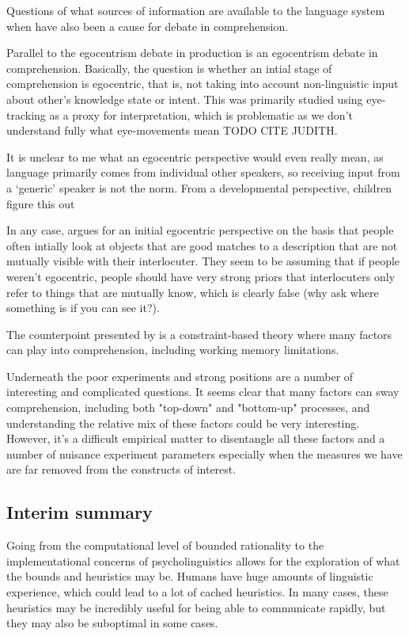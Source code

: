 \documentclass[]{article}
\begin{document}
Questions of what sources of information are available to the language system when have also been a cause for debate in comprehension. 

Parallel to the egocentrism debate in production is an egocentrism debate in comprehension. Basically, the question is whether an intial stage of comprehension is egocentric, that is, not taking into account non-linguistic input about other's knowledge state or intent. This was primarily studied using eye-tracking as a proxy for interpretation, which is problematic as we don't understand fully what eye-movements mean TODO CITE JUDITH. 

It is unclear to me what an egocentric perspective would even really mean, as language primarily comes from individual other speakers, so receiving input from a `generic' speaker is not the norm. From a developmental perspective, children figure this out %

In any case, \cite{keysar2000} argues for an initial egocentric perspective on the basis that people often intially look at objects that are good matches to a description that are not mutually visible with their interlocuter. They seem to be assuming that if people weren't egocentric, people should have very strong priors that interlocuters only refer to things that are mutually know, which is clearly false (why ask where something is if you can see it?). 

The counterpoint presented by \cite{hanna2003} is a constraint-based theory where many factors can play into comprehension, including working memory limitations. 

Underneath the poor experiments and strong positions are a number of interesting and complicated questions. It seems clear that many factors can sway comprehension, including both "top-down" and "bottom-up" processes, and understanding the relative mix of these factors could be very interesting. However, it's a difficult empirical matter to disentangle all these factors and a number of nuisance experiment parameters especially when the measures we have are far removed from the constructs of interest. 





\subsection{Interim summary}

Going from the computational level of bounded rationality to the implementational concerns of psycholinguistics allows for the exploration of what the bounds and heuristics may be. Humans have huge amounts of linguistic experience, which could lead to a lot of cached heuristics. In many cases, these heuristics may be incredibly useful for being able to communicate rapidly, but they may also be suboptimal in some cases. 
\end{document}
